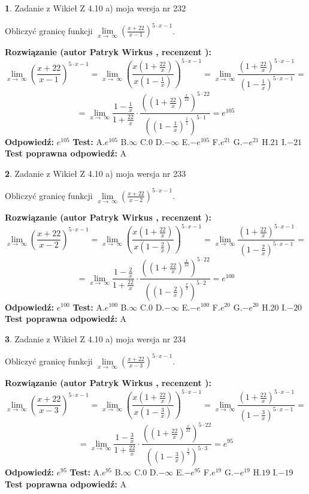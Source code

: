 \documentclass[12pt, a4paper]{article}
\theoremstyle{definition} %
\newtheorem{zad}{}
\newcommand{\zadStart}[1]{\begin{zad}#1\newline}
\newcommand{\zadStop}{\end{zad}}
\newcommand{\rozwStart}[2]{\noindent \textbf{Rozwiązanie (autor #1 , recenzent #2): }\newline}
\newcommand{\rozwStop}{\newline}
\newcommand{\odpStart}{\noindent \textbf{Odpowiedź:}\newline}
\newcommand{\odpStop}{\newline}
\newcommand{\testStart}{\noindent \textbf{Test:}\newline}
\newcommand{\testStop}{\newline}
\newcommand{\kluczStart}{\noindent \textbf{Test poprawna odpowiedź:}\newline}
\newcommand{\kluczStop}{\newline}
\begin{document}
\zadStart{Zadanie z Wikieł Z 4.10 a) moja wersja nr 232}

Obliczyć granicę funkcji  $\lim\limits_{x\to\ \infty}(\frac{x+22}{x-1})^{5\cdot x-1}$.
\zadStop
\rozwStart{Patryk Wirkus}{}
$$\lim\limits_{x\to\ \infty}(\frac{x+22}{x-1})^{5\cdot x-1} = \lim\limits_{x\to\ \infty}(\frac{x(1+\frac{22}{x})}{x(1-\frac{1}{x})})^{5\cdot x-1}=\lim\limits_{x\to\ \infty}\frac{(1+\frac{22}{x})^{5\cdot x-1}}{(1-\frac{1}{x})^{5\cdot x-1}}=$$
$$=\lim\limits_{x\to\ \infty}\frac{1-\frac{1}{x}}{1+\frac{22}{x}}\cdot\frac{((1+\frac{22}{x})^{\frac{x}{22}})^{5\cdot22}}{((1-\frac{1}{x})^{\frac{x}{1}})^{5\cdot1}}=e^{105}$$
\rozwStop
\odpStart
$e^{105}$
\odpStop
\testStart
A.$e^{105}$ B.$\infty$ C.$0$ D.$-\infty$ E.$-e^{105}$
F.$e^{21}$ G.$-e^{21}$
H.$21$
I.$-21$
\testStop
\kluczStart
A
\kluczStop



\zadStart{Zadanie z Wikieł Z 4.10 a) moja wersja nr 233}

Obliczyć granicę funkcji  $\lim\limits_{x\to\ \infty}(\frac{x+22}{x-2})^{5\cdot x-1}$.
\zadStop
\rozwStart{Patryk Wirkus}{}
$$\lim\limits_{x\to\ \infty}(\frac{x+22}{x-2})^{5\cdot x-1} = \lim\limits_{x\to\ \infty}(\frac{x(1+\frac{22}{x})}{x(1-\frac{2}{x})})^{5\cdot x-1}=\lim\limits_{x\to\ \infty}\frac{(1+\frac{22}{x})^{5\cdot x-1}}{(1-\frac{2}{x})^{5\cdot x-1}}=$$
$$=\lim\limits_{x\to\ \infty}\frac{1-\frac{2}{x}}{1+\frac{22}{x}}\cdot\frac{((1+\frac{22}{x})^{\frac{x}{22}})^{5\cdot22}}{((1-\frac{2}{x})^{\frac{x}{2}})^{5\cdot2}}=e^{100}$$
\rozwStop
\odpStart
$e^{100}$
\odpStop
\testStart
A.$e^{100}$ B.$\infty$ C.$0$ D.$-\infty$ E.$-e^{100}$
F.$e^{20}$ G.$-e^{20}$
H.$20$
I.$-20$
\testStop
\kluczStart
A
\kluczStop



\zadStart{Zadanie z Wikieł Z 4.10 a) moja wersja nr 234}

Obliczyć granicę funkcji  $\lim\limits_{x\to\ \infty}(\frac{x+22}{x-3})^{5\cdot x-1}$.
\zadStop
\rozwStart{Patryk Wirkus}{}
$$\lim\limits_{x\to\ \infty}(\frac{x+22}{x-3})^{5\cdot x-1} = \lim\limits_{x\to\ \infty}(\frac{x(1+\frac{22}{x})}{x(1-\frac{3}{x})})^{5\cdot x-1}=\lim\limits_{x\to\ \infty}\frac{(1+\frac{22}{x})^{5\cdot x-1}}{(1-\frac{3}{x})^{5\cdot x-1}}=$$
$$=\lim\limits_{x\to\ \infty}\frac{1-\frac{3}{x}}{1+\frac{22}{x}}\cdot\frac{((1+\frac{22}{x})^{\frac{x}{22}})^{5\cdot22}}{((1-\frac{3}{x})^{\frac{x}{3}})^{5\cdot3}}=e^{95}$$
\rozwStop
\odpStart
$e^{95}$
\odpStop
\testStart
A.$e^{95}$ B.$\infty$ C.$0$ D.$-\infty$ E.$-e^{95}$
F.$e^{19}$ G.$-e^{19}$
H.$19$
I.$-19$
\testStop
\kluczStart
A
\kluczStop
\end{document}
